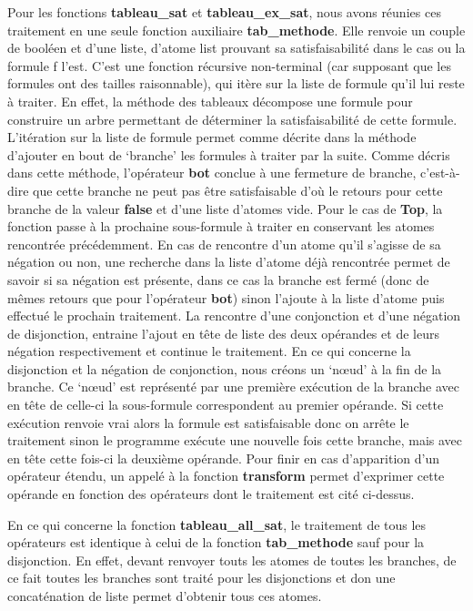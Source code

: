 \documentclass[12pt]{article}
\begin{document}
    Pour les fonctions \textbf{tableau\_sat} et \textbf{tableau\_ex\_sat}, nous 
    avons réunies ces traitement en une seule fonction auxiliaire \textbf{tab\_methode}.
    Elle renvoie un couple de booléen et d'une liste, d'atome list prouvant sa 
    satisfaisabilité dans le cas ou la formule f l'est. C'est une fonction récursive
    non-terminal (car supposant que les formules ont des tailles raisonnable), qui 
    itère sur la liste de formule qu'il lui reste à traiter. En effet, la méthode 
    des tableaux décompose une formule pour construire un arbre permettant de 
    déterminer la satisfaisabilité de cette formule. L'itération sur la liste de 
    formule permet comme décrite dans la méthode d'ajouter en bout de `branche'
    les formules à traiter par la suite. Comme décris dans cette méthode, l'opérateur
    \textbf{bot} conclue à une fermeture de branche, c'est-à-dire que cette 
    branche ne peut pas être satisfaisable d'où le retours pour cette branche de 
    la valeur \textbf{false} et d'une liste d'atomes vide. Pour le cas de 
    \textbf{Top}, la fonction passe à la prochaine sous-formule à traiter en 
    conservant les atomes rencontrée précédemment. En cas de rencontre d'un 
    atome qu'il s'agisse de sa négation ou non, une recherche dans la liste d'atome
    déjà rencontrée permet de savoir si sa négation est présente, dans ce cas 
    la branche est fermé (donc de mêmes retours que pour l'opérateur \textbf{bot})
    sinon l'ajoute à la liste d'atome puis effectué le prochain traitement. La 
    rencontre d'une conjonction et d'une négation de disjonction, entraine 
    l'ajout en tête de liste des deux opérandes et de leurs négation 
    respectivement et continue le traitement.
    En ce qui concerne la disjonction et la négation de conjonction, nous créons 
    un `nœud' à la fin de la branche. Ce `nœud' est représenté par une première
    exécution de la branche avec en tête de celle-ci la sous-formule correspondent 
    au premier opérande. Si cette exécution renvoie vrai alors la formule est 
    satisfaisable donc on arrête le traitement sinon le programme exécute une nouvelle 
    fois cette branche, mais avec en tête cette fois-ci la deuxième opérande. Pour 
    finir en cas d'apparition d'un opérateur étendu, un appelé à la fonction 
    \textbf{transform} permet d'exprimer cette opérande en fonction des opérateurs
    dont le traitement est cité ci-dessus.

    En ce qui concerne la fonction \textbf{tableau\_all\_sat}, le traitement de 
    tous les opérateurs est identique à celui de la fonction \textbf{tab\_methode}
    sauf pour la disjonction. En effet, devant renvoyer touts les atomes de toutes 
    les branches, de ce fait toutes les branches sont traité pour les disjonctions
    et don  une concaténation de liste permet d'obtenir tous ces atomes.
\end{document}
